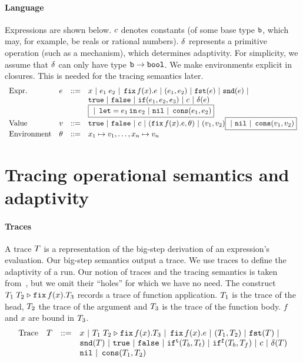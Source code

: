 \documentclass[a4paper,11pt]{article}
\theoremstyle{definition}
\begin{document}
\paragraph{Language}
Expressions are shown below. $c$ denotes constants (of some base
type $\mathtt{b}$, which may, for example, be reals or rational
numbers). $\delta$ represents a primitive operation (such as a
mechanism), which determines adaptivity. For simplicity, we assume
that $\delta$ can only have type $\mathtt{b} \to \mathtt{bool}$. We make
environments explicit in closures. This is needed for the tracing
semantics later.
\[\begin{array}{llll}
\mbox{Expr.} & \expr & ::= & x ~|~ \expr_1 \eapp \expr_2 ~|~ \efix f(x).\expr
 ~|~ (\expr_1, \expr_2) ~|~ \eprojl(\expr) ~|~ \eprojr(\expr) ~| \\
%
& & & \etrue ~|~ \efalse ~|~ \eif(\expr_1, \expr_2, \expr_3) ~|~
\econst ~|~ \eop(\expr) \\
& & & \boxed{~|~ \elet  = \expr_1 \ein \expr_2 ~|~ \enil ~|~  \econs (
      \expr_1, \expr_2) } \\
%
\mbox{Value} & \valr & ::= & \etrue ~|~ \efalse ~|~ \econst ~|~
(\efix f(x).\expr, \env) ~|~ (\valr_1, \valr_2) 
    \boxed{  ~|~ \enil ~|~ \econs (\valr_1, \valr_2)} \\
%
\mbox{Environment} & \env & ::= & x_1 \mapsto \valr_1, \ldots, x_n \mapsto \valr_n
\end{array}\]





\section{Tracing operational semantics and adaptivity}

\paragraph{Traces}
A trace $T$ is a representation of the big-step derivation of an
expression's evaluation. Our big-step semantics output a trace. We use
traces to define the adaptivity of a run. Our notion of traces and the
tracing semantics is taken from~\cite[Section 4]{perera:dep}, but we
omit their ``holes'' for which we have no need. The construct
$T_1 \; T_2 \mathrel{\triangleright} {\mathop{\mathtt{fix}} f(x).T_3}$ records a trace of function
application. $T_1$ is the trace of the head, $T_2$ the trace of
the argument and $T_3$ is the trace of the function body. $f$ and
$x$ are bound in $T_3$.
%
\[\begin{array}{llll}
\mbox{Trace} & \tr & ::= & x ~|~ \trapp{\tr_1}{\tr_2}{f}{x}{\tr_3} ~|~
\trfix f(x).e ~|~ (\tr_1, \tr_2) ~|~ \trprojl(\tr) ~|\\ 
%
& & & \trprojr(\tr) ~|~ \trtrue ~|~ \trfalse ~|~ \trift(\tr_b, \tr_t)
~|~ \triff(\tr_b, \tr_f) ~|~ \trconst ~|~ \trop(\tr) \\
%
& & & \trnil ~|~ \trcons (\tr_1, \tr_2)
\end{array}\]
\end{document}
